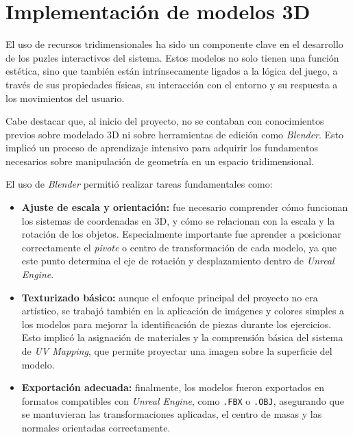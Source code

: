 \section{Implementación de modelos 3D}

El uso de recursos tridimensionales ha sido un componente clave en el desarrollo de los puzles interactivos del sistema. Estos modelos no solo tienen una función estética, sino que también están intrínsecamente ligados a la lógica del juego, a través de sus propiedades físicas, su interacción con el entorno y su respuesta a los movimientos del usuario.

Cabe destacar que, al inicio del proyecto, no se contaban con conocimientos previos sobre modelado 3D ni sobre herramientas de edición como \textit{Blender}. Esto implicó un proceso de aprendizaje intensivo para adquirir los fundamentos necesarios sobre manipulación de geometría en un espacio tridimensional. 

El uso de \textit{Blender} permitió realizar tareas fundamentales como:

\begin{itemize}
    \item \textbf{Ajuste de escala y orientación:} fue necesario comprender cómo funcionan los sistemas de coordenadas en 3D, y cómo se relacionan con la escala y la rotación de los objetos. Especialmente importante fue aprender a posicionar correctamente el \textit{pivote} o centro de transformación de cada modelo, ya que este punto determina el eje de rotación y desplazamiento dentro de \textit{Unreal Engine}.
    
    \item \textbf{Texturizado básico:} aunque el enfoque principal del proyecto no era artístico, se trabajó también en la aplicación de imágenes y colores simples a los modelos para mejorar la identificación de piezas durante los ejercicios. Esto implicó la asignación de materiales y la comprensión básica del sistema de \textit{UV Mapping}, que permite proyectar una imagen sobre la superficie del modelo.
    
    \item \textbf{Exportación adecuada:} finalmente, los modelos fueron exportados en formatos compatibles con \textit{Unreal Engine}, como \texttt{.FBX} o \texttt{.OBJ}, asegurando que se mantuvieran las transformaciones aplicadas, el centro de masas y las normales orientadas correctamente.
    
\end{itemize}

